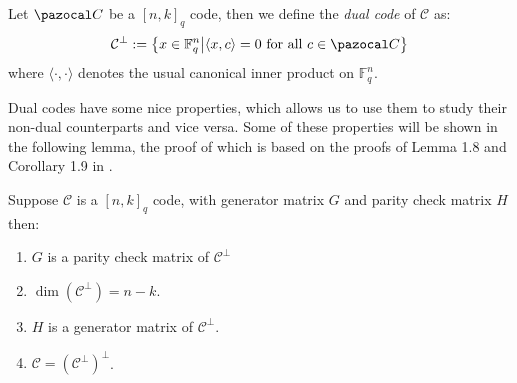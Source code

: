 \begin{definition}
  Let $\C$ be a $[n, k]_{q}$ code, then we define the \textit{dual code} of $\mathcal{C}$ as:
  \begin{equation*}
    \mathcal{C}^{\perp} := \left\{x \in \F_{q}^{n} \middle| \langle x, c \rangle = 0 \text{ for all } c \in \C\right\}
  \end{equation*}
  where $\langle \cdot, \cdot \rangle$ denotes the usual canonical inner product on $\mathbb{F}_{q}^{n}$. %
\end{definition}

Dual codes have some nice properties, which allows us to use them to study their non-dual counterparts and vice versa. Some of these properties will be shown in the following lemma, the proof of which is based on the proofs of Lemma 1.8 and Corollary 1.9 in \cite{notes_on_alg_geom_codes}.
\begin{lemma}\label{lem:properties_of_dual_codes}
  Suppose $\mathcal{C}$ is a $[n, k]_{q}$ code, with generator matrix $G$ and parity check matrix $H$ then:
  \begin{enumerate}
    \item $G$ is a parity check matrix of $\mathcal{C}^{\perp}$ \label{lem:properties_of_dual_codes:parity_check}
    \item $\dim(\mathcal{C}^{\perp}) = n - k$. \label{lem:properties_of_dual_codes:dimension}
    \item $H$ is a generator matrix of $\mathcal{C}^{\perp}$. \label{lem:properties_of_dual_codes:generator_matrix}
    \item $\mathcal{C} = (\mathcal{C}^{\perp})^{\perp}$. \label{lem:properties_of_dual_codes:complement_of_complement}
  \end{enumerate}
\end{lemma}
